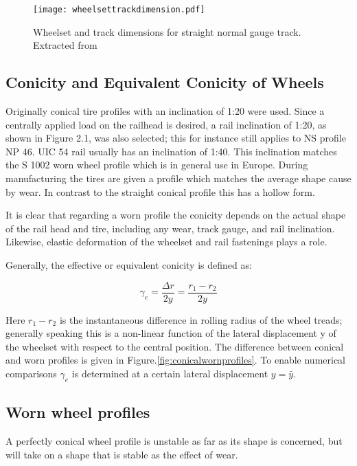 \begin{figure}[h]
\centering
\texttt{[image: wheelsettrackdimension.pdf]}
\caption{Wheelset and track dimensions for straight normal gauge track. Extracted from \cite[p.17]{esveld2001modern}}
\label{fig:wheelset and track dimensions}
\end{figure}

\subsection{Conicity and Equivalent Conicity of Wheels}

Originally conical tire profiles with an inclination of 1:20 were used. Since a centrally applied load on the railhead is desired, a rail inclination of 1:20, as shown in Figure 2.1, was also selected; this for instance still applies to NS profile NP 46. UIC 54 rail usually has an inclination of 1:40. This inclination matches the S 1002 worn wheel profile which is in general use in Europe. During manufacturing the tires are given a profile which matches the average shape cause by wear. In contrast to the straight conical profile this has a hollow form.

It is clear that regarding a worn profile the conicity depends on the actual shape of the rail head and tire, including any wear, track gauge, and rail inclination. Likewise, elastic deformation of the wheelset and rail fastenings plays a role.

Generally, the effective or equivalent conicity is defined as:

$$ \gamma_e = \frac{\Delta r}{2y} = \frac{r_1 - r_2}{2y}  $$

Here $r_1 - r_2$ is the instantaneous difference in rolling radius of the wheel treads; generally speaking this is a non-linear function of the lateral displacement y of the wheelset with respect to the central position. The difference between conical and worn profiles is given in Figure.\ref{fig:conicalwornprofiles}. To enable numerical comparisons $\gamma_e$ is determined at a certain lateral displacement $y=\bar{y}$.

\subsection{Worn wheel profiles}

A perfectly conical wheel profile is unstable as far as its shape is concerned, but will take on a shape that is stable as the effect of wear.

